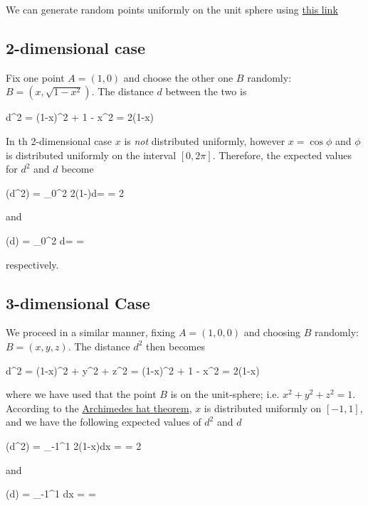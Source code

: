 

We can generate random points uniformly on the unit sphere using \href{https://stats.stackexchange.com/questions/7977/how-to-generate-uniformly-distributed-points-on-the-surface-of-the-3-d-unit-sphe}{this link}

\subsection{2-dimensional case}

Fix one point $A = (1,0)$ and choose the other one $B$ randomly: $B = (x, \sqrt{1-x^2})$. The distance $d$ between the two is

\bee
d^2 = (1-x)^2 + 1 - x^2 = 2(1-x)
\eee

In th 2-dimensional case $x$ is \emph{not} distributed uniformly, however $x = \cos \phi$ and $\phi$ is distributed uniformly on the interval $[0, 2\pi]$. Therefore, the expected values for $d^2$ and $d$ become

\bee
\mE(d^2) =  \int_0^{2\pi} 2(1-\cos \phi)d\phi = \cdots = 2
\eee

and

\bee
\mE(d) =  \int_0^{2\pi}  d\phi = \cdots = 
\eee

respectively.

\subsection{3-dimensional Case}

We proceed in a similar manner, fixing $A = (1,0,0)$ and choosing $B$ randomly: $B = (x,y,z)$. The distance $d^2$ then becomes

\bee
d^2 = (1-x)^2 + y^2 + z^2 = (1-x)^2 + 1 - x^2 = 2(1-x)
\eee

where we have used that the point $B$ is on the unit-sphere; i.e. $x^2 + y^2 + z^2 = 1$. According to the \href{http://mathworld.wolfram.com/ArchimedesHat-BoxTheorem.html}{Archimedes hat theorem}, $x$ is distributed uniformly on $[-1,1]$, and we have the following expected values of $d^2$ and $d$

\bee
\mE(d^2) =  \int_{-1}^{1} 2(1-x)dx = \cdots = 2
\eee

and

\bee
\mE(d) =  \int_{-1}^{1}  dx = \cdots = 
\eee

